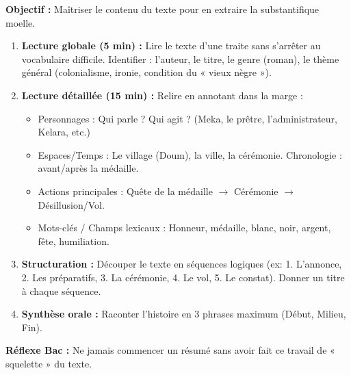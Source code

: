 \documentclass[11pt]{article}
\newcommand{\cle}[1]{{\popxbold\color{popdark}#1}}
\begin{document}
\begin{methode}
    \textbf{Objectif :} Maîtriser le contenu du texte pour en extraire la substantifique moelle.
    \begin{enumerate}
        \item \textbf{Lecture globale (5 min) :} Lire le texte d'une traite sans s'arrêter au vocabulaire difficile. Identifier : l'auteur, le titre, le genre (roman), le thème général (colonialisme, ironie, condition du « vieux nègre »).
        \item \textbf{Lecture détaillée (15 min) :} Relire en annotant dans la marge :
              \begin{itemize}
                  \item \cle{Personnages} : Qui parle ? Qui agit ? (Meka, le prêtre, l'administrateur, Kelara, etc.)
                  \item \cle{Espaces/Temps} : Le village (Doum), la ville, la cérémonie. Chronologie : avant/après la médaille.
                  \item \cle{Actions principales} : Quête de la médaille $\rightarrow$ Cérémonie $\rightarrow$ Désillusion/Vol.
                  \item \cle{Mots-clés / Champs lexicaux} : Honneur, médaille, blanc, noir, argent, fête, humiliation.
              \end{itemize}
        \item \textbf{Structuration :} Découper le texte en \cle{séquences logiques} (ex: 1. L'annonce, 2. Les préparatifs, 3. La cérémonie, 4. Le vol, 5. Le constat). Donner un titre à chaque séquence.
        \item \textbf{Synthèse orale :} Raconter l'histoire en 3 phrases maximum (Début, Milieu, Fin).
    \end{enumerate}
    \textbf{Réflexe Bac :} Ne jamais commencer un résumé sans avoir fait ce travail de « squelette » du texte.
\end{methode}
\end{document}
